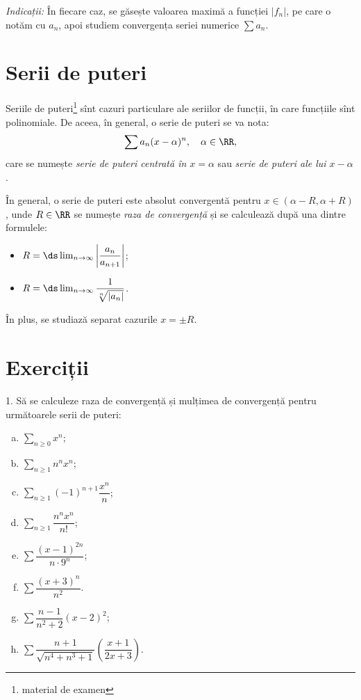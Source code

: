 \emph{Indicații:} În fiecare caz, se găsește valoarea maximă a funcției $ | f_n | $,
pe care o notăm cu $ a_n $, apoi studiem convergența seriei numerice $ \sum a_n $.

\section{Serii de puteri}

Seriile de puteri\footnote{material de examen} sînt cazuri particulare ale
seriilor de funcții, în care funcțiile sînt polinomiale. De aceea, în general,
o serie de puteri se va nota:
\[
  \sum a_n (x - \alpha)^n, \quad \alpha \in \RR,
\]
care se numește \emph{serie de puteri centrată în $ x = \alpha $} sau
\emph{serie de puteri ale lui $ x - \alpha $}.

În general, o serie de puteri este absolut convergentă pentru $ x \in (\alpha - R, \alpha + R) $, unde
$ R \in \RR $ se numește \emph{raza de convergență} și se calculează după una dintre
formulele:
\begin{itemize}
\item $ R = \ds\lim_{n \to \infty} \left| \dfrac{a_n}{a_{n+1}} \right| $;
\item $ R = \ds\lim_{n \to \infty} \dfrac{1}{\sqrt[n]{|a_n|}} $.
\end{itemize}

În plus, se studiază separat cazurile $ x = \pm R $.

\section{Exerciții}

1. Să se calculeze raza de convergență și mulțimea de convergență pentru
următoarele serii de puteri:
\begin{enumerate}[(a)]
\item $ \sum_{n \geq 0} x^n $;
\item $ \sum_{n \geq 1} n^n x^n $;
\item $ \sum_{n \geq 1} (-1)^{n+1} \dfrac{x^n}{n} $;
\item $ \sum_{n \geq 1} \dfrac{n^nx^n}{n!} $;
\item $ \sum \dfrac{(x - 1)^{2n}}{n \cdot 9^n} $;
\item $ \sum \dfrac{(x + 3)^n}{n^2} $.
\item $ \sum \dfrac{n - 1}{n^2 + 2} (x - 2)^2 $;
\item $ \sum \dfrac{n + 1}{\sqrt{n^4 + n^3 + 1}} \left( \dfrac{x + 1}{2x + 3} \right) $.
\end{enumerate}

